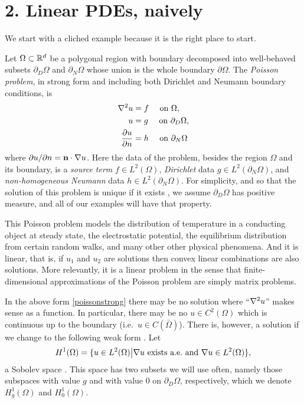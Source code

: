 
\chapter{2. Linear PDEs, naively}

We start with a cliched example because it is the right place to start.

Let $\Omega \subset \mathbb{R}^d$ be a polygonal region with boundary decomposed into well-behaved subsets $\partial_D \Omega$ and $\partial_N \Omega$ whose union is the whole boundary $\partial \Omega$.  The \emph{Poisson problem}, in strong form and including both Dirichlet and Neumann boundary conditions, is
\begin{align}
\nabla^2 u &= f \quad \text{ on } \Omega, \label{poissonstrong} \\
u &= g \quad \text{ on } \partial_D \Omega, \notag \\
\frac{\partial u}{\partial n} &= h \quad \text{ on } \partial_N \Omega \notag
\end{align}
where $\partial u/\partial n = \mathbf{n} \cdot \nabla u$.  Here the data of the problem, besides the region $\Omega$ and its boundary, is a \emph{source term} $f\in L^2(\Omega)$, \emph{Dirichlet} data $g\in L^2(\partial_N \Omega)$, and \emph{non-homogeneous Neumann} data $h\in L^2(\partial_N \Omega)$.  For simplicity, and so that the solution of this problem is unique if it exists \citep{Elmanetal2005}, we assume $\partial_D \Omega$ has positive measure, and all of our examples will have that property.

This Poisson problem models the distribution of temperature in a conducting object at steady state, the electrostatic potential, the equilibrium distribution from certain random walks, and many other other physical phenomena.  And it is linear, that is, if $u_1$ and $u_2$ are solutions then convex linear combinations are also solutions.  More relevantly, it is a linear problem in the sense that finite-dimensional approximations of the Poisson problem are simply matrix problems.

In the above form \eqref{poissonstrong} there may be no solution where ``$\nabla^2 u$'' makes sense as a function.  In particular, there may be no $u\in C^2(\Omega)$ which is continuous up to the boundary (i.e.~$u\in C(\bar\Omega)$).  There is, however, a solution if we change to the following weak form \citep{Elmanetal2005}.  Let
    $$H^1(\Omega) = \{u\in L^2(\Omega) \big| \nabla u \text{ exists a.e.~and } \nabla u \in L^2(\Omega)\},$$
a Sobolev space \citep{Evans}.  This space has two subsets we will use often, namely those subspaces with value $g$ and with value $0$ on $\partial_D \Omega$, respectively, which we denote $H_g^1(\Omega)$ and $H_0^1(\Omega)$.

